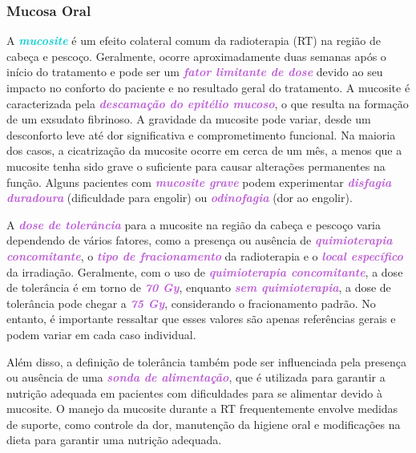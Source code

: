 \documentclass[11pt,a4paper]{article}
\begin{document}
\subsubsection*{Mucosa Oral}

	A \textcolor{DarkTurquoise}{\textbf{\textit{mucosite}}} é um efeito colateral comum da radioterapia (RT) na região de cabeça e pescoço. Geralmente, ocorre aproximadamente duas semanas após o início do tratamento e pode ser um \textcolor{MediumOrchid}{\textbf{\textit{fator limitante de dose}}} devido ao seu impacto no conforto do paciente e no resultado geral do tratamento. A mucosite é caracterizada pela \textcolor{MediumOrchid}{\textbf{\textit{descamação do epitélio mucoso}}}, o que resulta na formação de um exsudato fibrinoso. A gravidade da mucosite pode variar, desde um desconforto leve até dor significativa e comprometimento funcional. Na maioria dos casos, a cicatrização da mucosite ocorre em cerca de um mês, a menos que a mucosite tenha sido grave o suficiente para causar alterações permanentes na função. Alguns pacientes com \textcolor{MediumOrchid}{\textbf{\textit{mucosite grave}}} podem experimentar \textcolor{MediumOrchid}{\textbf{\textit{disfagia duradoura}}} (dificuldade para engolir) ou \textcolor{MediumOrchid}{\textbf{\textit{odinofagia}}} (dor ao engolir).

	A \textcolor{MediumOrchid}{\textbf{\textit{dose de tolerância}}} para a mucosite na região da cabeça e pescoço varia dependendo de vários fatores, como a presença ou ausência de \textcolor{MediumOrchid}{\textbf{\textit{quimioterapia concomitante}}}, o \textcolor{MediumOrchid}{\textbf{\textit{tipo de fracionamento}}} da radioterapia e o \textcolor{MediumOrchid}{\textbf{\textit{local específico}}} da irradiação. Geralmente, com o uso de \textcolor{MediumOrchid}{\textbf{\textit{quimioterapia concomitante}}}, a dose de tolerância é em torno de \textcolor{MediumOrchid}{\textbf{\textit{70 Gy}}}, enquanto \textcolor{MediumOrchid}{\textbf{\textit{sem quimioterapia}}}, a dose de tolerância pode chegar a \textcolor{MediumOrchid}{\textbf{\textit{75 Gy}}}, considerando o fracionamento padrão. No entanto, é importante ressaltar que esses valores são apenas referências gerais e podem variar em cada caso individual. 
	
	Além disso, a definição de tolerância também pode ser influenciada pela presença ou ausência de uma \textcolor{MediumOrchid}{\textbf{\textit{sonda de alimentação}}}, que é utilizada para garantir a nutrição adequada em pacientes com dificuldades para se alimentar devido à mucosite. O manejo da mucosite durante a RT frequentemente envolve medidas de suporte, como controle da dor, manutenção da higiene oral e modificações na dieta para garantir uma nutrição adequada.
\end{document}
